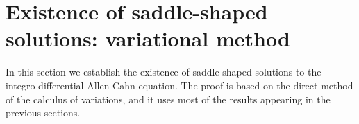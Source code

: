 \documentclass[12pt,reqno]{amsart}
\theoremstyle{definition}
\theoremstyle{remark}
\numberwithin{equation}{section}
\begin{document}
\section{Existence of saddle-shaped solutions: variational method}
\label{Sec:Existence}


In this section we establish the existence of saddle-shaped solutions to the integro-differential Allen-Cahn equation. The proof is based on the direct method of the calculus of variations, and it uses most of the results appearing in the previous sections.
\end{document}
